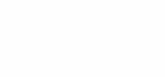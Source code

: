 \newcommand{\cccvname}{Christian Uhl}
\newcommand{\cccvjobtitle}{IT Consultant}

\NoBgThispage
\AddToShipoutPicture*{\BackgroundPic}
\vspace*{18.5cm}
\noindent
\textcolor{white}{
{\Huge CV -- \cccvname}\\[8pt]
{\huge (\cccvjobtitle)}\\
\\[8pt]
{\Large codecentric AG | \today}
}
